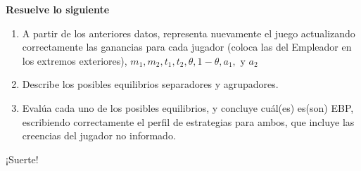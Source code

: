 \documentclass[12pt]{scrartcl} %
\begin{document}
\begin{Exercise}[title={Información incompleta: mercado del trabajo},name={Pregunta}]
  \textbf{Resuelve lo siguiente}

  \begin{enumerate}
    \setlength{\itemsep}{0pt}
    \setlength{\parskip}{0pt}
    \setlength{\parsep}{0pt}
    \item A partir de los anteriores datos, representa nuevamente el juego actualizando correctamente las ganancias para cada jugador (coloca las del Empleador en los extremos exteriores), $ m_1, m_2, t_1, t_2, \theta, 1-\theta, a_1, \text{ y } a_2 $
    \item Describe los posibles equilibrios separadores y agrupadores.
    \item Evalúa cada uno de los posibles equilibrios, y concluye cuál(es) es(son) EBP, escribiendo correctamente el perfil de estrategias para ambos, que incluye las creencias del jugador no informado.
  \end{enumerate}

\end{Exercise}

\begin{center}
  ¡Suerte!

  \LARGE\Cat[1.2]
\end{center}
\end{document}
